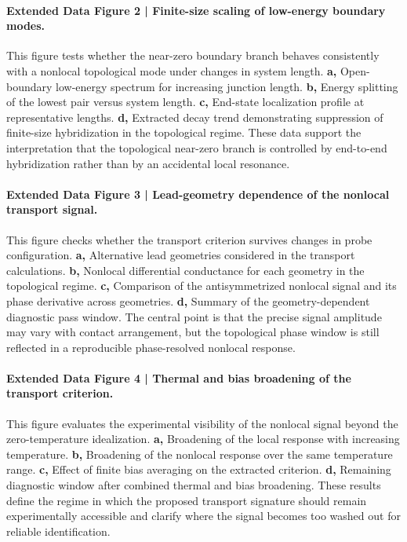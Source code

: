 \documentclass[11pt]{article}
\begin{document}
\paragraph{Extended Data Figure 2 | Finite-size scaling of low-energy boundary modes.}
This figure tests whether the near-zero boundary branch behaves consistently with a nonlocal topological mode under changes in system length. \textbf{a,} Open-boundary low-energy spectrum for increasing junction length. \textbf{b,} Energy splitting of the lowest pair versus system length. \textbf{c,} End-state localization profile at representative lengths. \textbf{d,} Extracted decay trend demonstrating suppression of finite-size hybridization in the topological regime. These data support the interpretation that the topological near-zero branch is controlled by end-to-end hybridization rather than by an accidental local resonance.

\paragraph{Extended Data Figure 3 | Lead-geometry dependence of the nonlocal transport signal.}
This figure checks whether the transport criterion survives changes in probe configuration. \textbf{a,} Alternative lead geometries considered in the transport calculations. \textbf{b,} Nonlocal differential conductance for each geometry in the topological regime. \textbf{c,} Comparison of the antisymmetrized nonlocal signal and its phase derivative across geometries. \textbf{d,} Summary of the geometry-dependent diagnostic pass window. The central point is that the precise signal amplitude may vary with contact arrangement, but the topological phase window is still reflected in a reproducible phase-resolved nonlocal response.

\paragraph{Extended Data Figure 4 | Thermal and bias broadening of the transport criterion.}
This figure evaluates the experimental visibility of the nonlocal signal beyond the zero-temperature idealization. \textbf{a,} Broadening of the local response with increasing temperature. \textbf{b,} Broadening of the nonlocal response over the same temperature range. \textbf{c,} Effect of finite bias averaging on the extracted criterion. \textbf{d,} Remaining diagnostic window after combined thermal and bias broadening. These results define the regime in which the proposed transport signature should remain experimentally accessible and clarify where the signal becomes too washed out for reliable identification.
\end{document}
